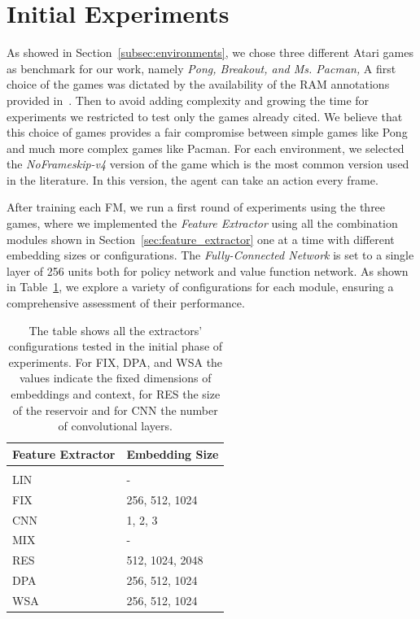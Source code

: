 \section{Initial Experiments}\label{sec:init_exp}
As showed in Section~\ref{subsec:environments}, we chose three different Atari games as benchmark for our work, namely \textit{Pong, Breakout, and Ms. Pacman,}
A first choice of the games was dictated by the availability of the RAM annotations provided in~\cite{anand2019unsupervised}.
Then to avoid adding complexity and growing the time for experiments we restricted to test only the games already cited.
We believe that this choice of games provides a fair compromise between simple games like Pong and much more complex games like Pacman.
For each environment, we selected the \textit{NoFrameskip-v4} version of the game which is the most common version used in the literature. 
In this version, the agent can take an action every frame.

After training each FM, we run a first round of experiments using the three games, where we implemented the \textit{Feature Extractor} using all the combination modules shown in Section~\ref{sec:feature_extractor} one at a time with different embedding sizes or configurations.
The \textit{Fully-Connected Network} is set to a single layer of 256 units both for policy network and value function network.
As shown in Table~\ref{tab:emb_siz_modules}, we explore a variety of configurations for each module, ensuring a comprehensive assessment of their performance.

\begin{table}[ht]
    \begin{center}
        \begin{tabular}{ll}
            \multicolumn{1}{l}{\bf Feature Extractor}  &\multicolumn{1}{l}{\bf Embedding Size}
            \\ \hline \\
            LIN              &  - \\
            FIX        & 256, 512, 1024 \\
            CNN       & 1, 2, 3\\
            MIX                             & - \\
            RES           & 512, 1024, 2048 \\
            DPA             & 256, 512, 1024 \\
            WSA         & 256, 512, 1024 \\

        \end{tabular}
    \end{center}
    \caption{The table shows all the extractors' configurations tested in the initial phase of experiments. For FIX, DPA, and WSA the values indicate the fixed dimensions of embeddings and context, for RES the size of the reservoir and for CNN the number of convolutional layers.}
    \label{tab:emb_siz_modules}
\end{table}


